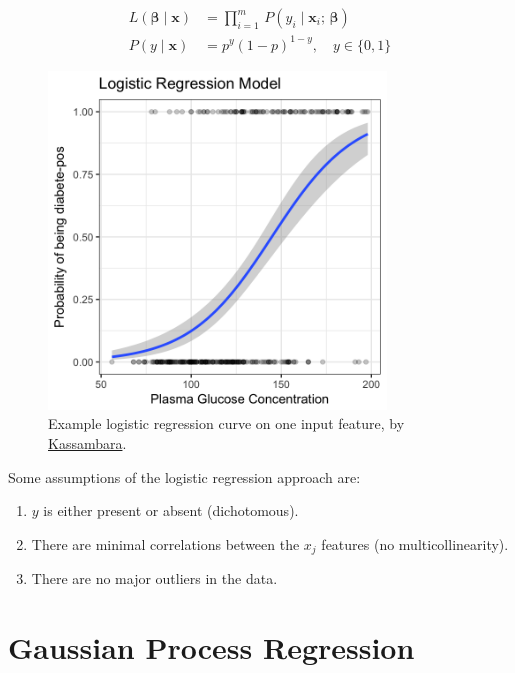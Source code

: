 \begin{subequations} \label{eq:logistic:L_Pr}
\begin{align}
L\left(\bm{\beta} \mid \mathbf{x}\right) &= \prod_{i=1}^{m} \, P\left(y_{i} \mid \mathbf{x}_{i};\,\bm{\beta}\right) \label{eq:logistic:L} \\
P\left(y \mid \mathbf{x}\right) &= p^y\left(1-p\right)^{1-y}, \quad y \in \{0, 1\} \label{eq:logistic:Pr}
\end{align}
\end{subequations}

\begin{figure}
\centering
\includegraphics[width=0.8\textwidth]{figures/regression/logistic-regression-probabilities-curve.png}
\caption{
Example logistic regression curve on one input feature, by \href{http://www.sthda.com/english/articles/36-classification-methods-essentials/151-logistic-regression-essentials-in-r/}{Kassambara}.
}
\label{fig:logistic_regression_ex}
\end{figure}

Some assumptions of the logistic regression approach are:
\begin{enumerate}[noitemsep]
\item $y$ is either present or absent (dichotomous).
\item There are minimal correlations between the $x_{j}$ features (no multicollinearity).
\item There are no major outliers in the data.
\end{enumerate}


\section{Gaussian Process Regression}
\label{Regression:kriging}

